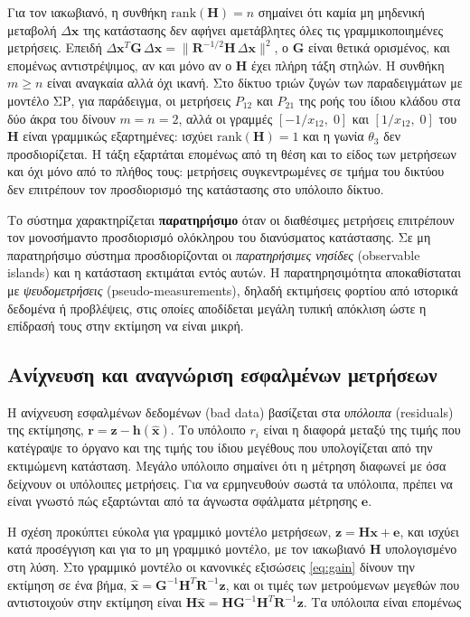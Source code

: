 Για τον ιακωβιανό, η συνθήκη $\mathrm{rank}(\mathbf{H}) = n$ σημαίνει ότι καμία μη μηδενική
μεταβολή $\Delta\mathbf{x}$ της κατάστασης δεν αφήνει αμετάβλητες όλες τις γραμμικοποιημένες
μετρήσεις. Επειδή
$\Delta\mathbf{x}^{T}\mathbf{G}\,\Delta\mathbf{x} = \|\mathbf{R}^{-1/2}\mathbf{H}\,\Delta\mathbf{x}\|^{2}$,
ο $\mathbf{G}$ είναι θετικά ορισμένος, και επομένως αντιστρέψιμος, αν και μόνο αν ο
$\mathbf{H}$ έχει πλήρη τάξη στηλών. Η συνθήκη $m \ge n$ είναι αναγκαία αλλά όχι ικανή. Στο
δίκτυο τριών ζυγών των παραδειγμάτων με μοντέλο ΣΡ, για παράδειγμα, οι μετρήσεις $P_{12}$ και
$P_{21}$ της ροής του ίδιου κλάδου στα δύο άκρα του δίνουν $m = n = 2$, αλλά οι γραμμές
$[-1/x_{12},\; 0]$ και $[1/x_{12},\; 0]$ του $\mathbf{H}$ είναι γραμμικώς εξαρτημένες: ισχύει
$\mathrm{rank}(\mathbf{H}) = 1$ και η γωνία $\theta_3$ δεν προσδιορίζεται. Η τάξη εξαρτάται
επομένως από τη θέση και το είδος των μετρήσεων και όχι μόνο από το πλήθος τους: μετρήσεις
συγκεντρωμένες σε τμήμα του δικτύου δεν επιτρέπουν τον προσδιορισμό της κατάστασης στο
υπόλοιπο δίκτυο.

Το σύστημα χαρακτηρίζεται \textbf{παρατηρήσιμο} όταν οι διαθέσιμες μετρήσεις επιτρέπουν τον
μονοσήμαντο προσδιορισμό ολόκληρου του διανύσματος κατάστασης. Σε μη παρατηρήσιμο σύστημα προσδιορίζονται οι
\emph{παρατηρήσιμες νησίδες} (observable islands) και η κατάσταση εκτιμάται εντός αυτών. Η
παρατηρησιμότητα αποκαθίσταται με \emph{ψευδομετρήσεις} (pseudo-measurements), δηλαδή
εκτιμήσεις φορτίου από ιστορικά δεδομένα ή προβλέψεις, στις οποίες αποδίδεται μεγάλη τυπική
απόκλιση ώστε η επίδρασή τους στην εκτίμηση να είναι μικρή.

\subsection{Ανίχνευση και αναγνώριση εσφαλμένων μετρήσεων}
\label{sec:baddata}

Η ανίχνευση εσφαλμένων δεδομένων (bad data) βασίζεται στα \emph{υπόλοιπα} (residuals) της
εκτίμησης, $\mathbf{r} = \mathbf{z}-\mathbf{h}(\hat{\mathbf{x}})$. Το υπόλοιπο $r_i$ είναι η
διαφορά μεταξύ της τιμής που κατέγραψε το όργανο και της τιμής του ίδιου μεγέθους που
υπολογίζεται από την εκτιμώμενη κατάσταση. Μεγάλο υπόλοιπο σημαίνει ότι η μέτρηση διαφωνεί με
όσα δείχνουν οι υπόλοιπες μετρήσεις. Για να ερμηνευθούν σωστά τα υπόλοιπα, πρέπει να είναι
γνωστό πώς εξαρτώνται από τα άγνωστα σφάλματα μέτρησης $\mathbf{e}$.

Η σχέση προκύπτει εύκολα για γραμμικό μοντέλο μετρήσεων, $\mathbf{z} = \mathbf{H}\mathbf{x} +
\mathbf{e}$, και ισχύει κατά προσέγγιση και για το μη γραμμικό μοντέλο, με τον ιακωβιανό
$\mathbf{H}$ υπολογισμένο στη λύση. Στο γραμμικό μοντέλο οι κανονικές εξισώσεις
\eqref{eq:gain} δίνουν την εκτίμηση σε ένα βήμα,
$\hat{\mathbf{x}} = \mathbf{G}^{-1}\mathbf{H}^{T}\mathbf{R}^{-1}\mathbf{z}$, και οι τιμές των
μετρούμενων μεγεθών που αντιστοιχούν στην εκτίμηση είναι
$\mathbf{H}\hat{\mathbf{x}} = \mathbf{H}\mathbf{G}^{-1}\mathbf{H}^{T}\mathbf{R}^{-1}\mathbf{z}$.
Τα υπόλοιπα είναι επομένως

